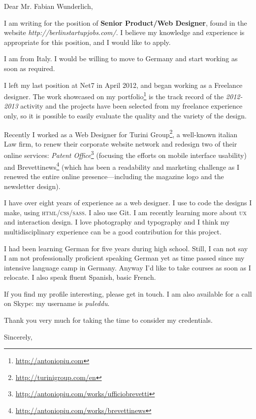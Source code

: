 \documentclass[11pt]{letter} %
\begin{document}
\begin{letter}{}
\opening{Dear Mr. Fabian Wunderlich,\\}

I am writing for the position of \textbf{Senior Product/Web Designer}, found in the website \emph{http://berlinstartupjobs.com/}. I believe my knowledge and experience is appropriate for this position, and I would like to apply.

I am from Italy. I would be willing to move to Germany and start working as soon as required. 

I left my last position at Net7 in April 2012, and began working as a Freelance designer.
The work showcased on my portfolio\footnote{\url{http://antoniopiu.com}} is the track record of the \emph{2012-2013} activity and the projects have been selected from my freelance experience only, so it is possible to easily evaluate the quality and the variety of the design.

Recently I worked as a Web Designer for Turini Group\footnote{\url{http://turinigroup.com/en}}, a well-known italian Law firm, to renew their corporate website network and redesign two of their online services: \emph{Patent Office}\footnote{\url{http://antoniopiu.com/works/ufficiobrevetti}} (focusing the efforts on mobile interface usability) and Brevettinews\footnote{\url{http://antoniopiu.com/works/brevettinews}} (which has been a readability and marketing challenge as I renewed the entire online presence—including the magazine logo and the newsletter design). 

I have over eight years of experience as a web designer. I use to code the designs I make, using \textsc{html/css/sass}. I also use Git. I am recently learning more about \textsc{ux} and interaction design. I love photography and typography and I think my multidisciplinary experience can be a good contribution for this project.

I had been learning German for five years during high school. Still, I can not say I am not professionally proficient speaking German yet as time passed since my intensive language camp in Germany. Anyway I'd like to take courses as soon as I relocate. I also speak fluent Spanish, basic French.

If you find my profile interesting, please get in touch. I am also available
for a call on Skype: my username is \emph{puleddu}.

Thank you very much for taking the time to consider my credentials.

\closing{Sincerely,}
\end{letter}
\end{document}
